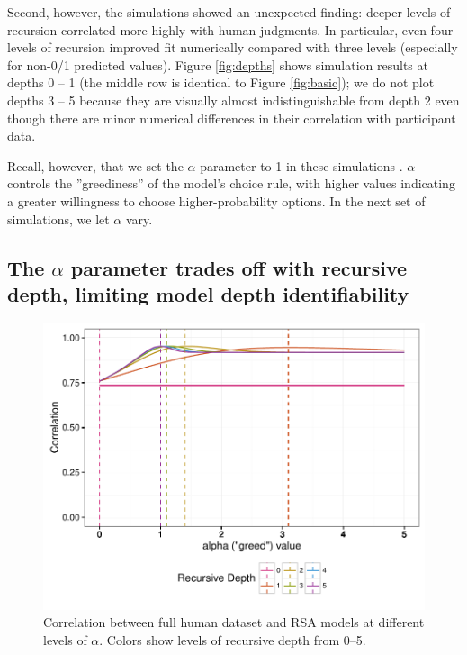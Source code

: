 \documentclass[man,noapacite]{apa2}
\begin{document}
Second, however, the simulations showed an unexpected finding: deeper levels of recursion correlated more highly with human judgments. In particular, even four levels of recursion improved fit numerically compared with three levels (especially for non-0/1 predicted values). Figure \ref{fig:depths} shows simulation results at depths 0 -- 1 (the middle row is identical to Figure \ref{fig:basic}); we do not plot depths 3 -- 5 because they are visually almost indistinguishable from depth 2 even though there are minor numerical differences in their correlation with participant data.

Recall, however, that we set the $\alpha$ parameter to 1 in these simulations . $\alpha$ controls the ''greediness'' of the model's choice rule, with higher values indicating a greater willingness to choose higher-probability options. In the next set of simulations, we let $\alpha$ vary.

\subsection{The $\alpha$ parameter trades off with recursive depth, limiting model depth identifiability}

\begin{figure}[t]
 \centering
 \includegraphics[width=5in]{../plots/alpha-fit.pdf}
 \caption{\label{fig:alpha-fit} Correlation between full human dataset and RSA models at different levels of $\alpha$. Colors show levels of recursive depth from 0--5.}
\end{figure}
\end{document}
